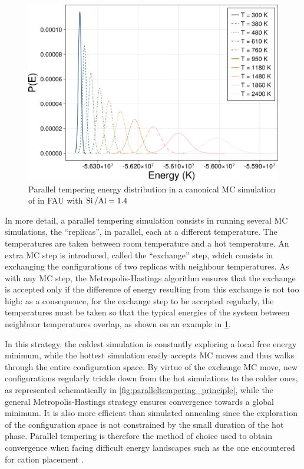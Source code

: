\documentclass[main.tex]{subfiles}
\begin{document}
\begin{figure}
	\centering
	\includegraphics[width=0.8\linewidth]{figures/cations/paralleltempering.pdf}
	\caption{Parallel tempering energy distribution in a canonical MC simulation of  in FAU with $\mbox{Si\,/Al} = \num{1.4}$}\label{fig:paralleltempering}
\end{figure}

In more detail, a parallel tempering simulation consists in running several MC simulations, the ``replicas'', in parallel, each at a different temperature. The temperatures are taken between room temperature and a hot temperature. An extra MC step is introduced, called the ``exchange'' step, which consists in exchanging the configurations of two replicas with neighbour temperatures. As with any MC step, the Metropolis-Hastings algorithm ensures that the exchange is accepted only if the difference of energy resulting from this exchange is not too high: as a consequence, for the exchange step to be accepted regularly, the temperatures must be taken so that the typical energies of the system between neighbour temperatures overlap, as shown on an example in \cref{fig:paralleltempering}.

In this strategy, the coldest simulation is constantly exploring a local free energy minimum, while the hottest simulation easily accepts MC moves and thus walks through the entire configuration space. By virtue of the exchange MC move, new configurations regularly trickle down from the hot simulations to the colder ones, as represented schematically in \cref{fig:paralleltempering_principle}, while the general Metropolis-Hastings strategy ensures convergence towards a global minimum. It is also more efficient than simulated annealing since the exploration of the configuration space is not constrained by the small duration of the hot phase. Parallel tempering is therefore the method of choice used to obtain convergence when facing difficult energy landscapes such as the one encountered for cation placement \autocite{Fang2016}.
\end{document}
